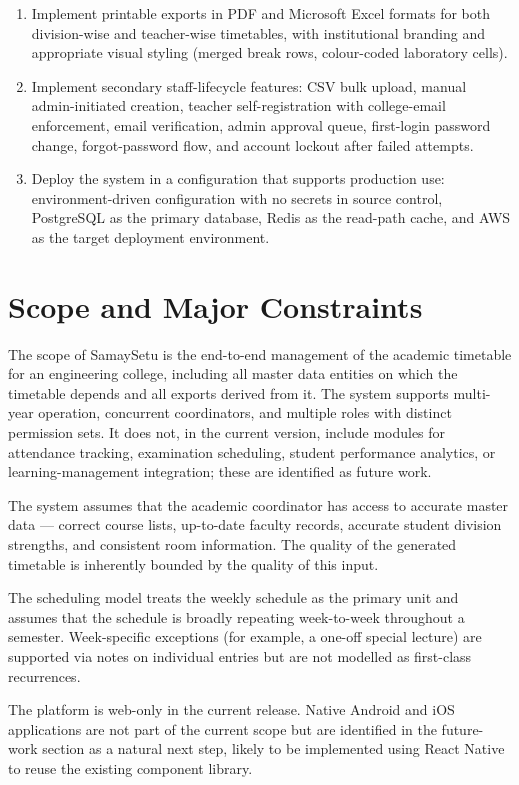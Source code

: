 \begin{enumerate}
    \item Implement printable exports in PDF and Microsoft Excel formats for both division-wise and teacher-wise timetables, with institutional branding and appropriate visual styling (merged break rows, colour-coded laboratory cells).
    \item Implement secondary staff-lifecycle features: CSV bulk upload, manual admin-initiated creation, teacher self-registration with college-email enforcement, email verification, admin approval queue, first-login password change, forgot-password flow, and account lockout after failed attempts.
    \item Deploy the system in a configuration that supports production use: environment-driven configuration with no secrets in source control, PostgreSQL as the primary database, Redis as the read-path cache, and AWS as the target deployment environment.
\end{enumerate}

\section{Scope and Major Constraints}

The scope of SamaySetu is the end-to-end management of the academic timetable for an engineering college, including all master data entities on which the timetable depends and all exports derived from it. The system supports multi-year operation, concurrent coordinators, and multiple roles with distinct permission sets. It does not, in the current version, include modules for attendance tracking, examination scheduling, student performance analytics, or learning-management integration; these are identified as future work.

The system assumes that the academic coordinator has access to accurate master data --- correct course lists, up-to-date faculty records, accurate student division strengths, and consistent room information. The quality of the generated timetable is inherently bounded by the quality of this input.

The scheduling model treats the weekly schedule as the primary unit and assumes that the schedule is broadly repeating week-to-week throughout a semester. Week-specific exceptions (for example, a one-off special lecture) are supported via notes on individual entries but are not modelled as first-class recurrences.

The platform is web-only in the current release. Native Android and iOS applications are not part of the current scope but are identified in the future-work section as a natural next step, likely to be implemented using React Native to reuse the existing component library.

